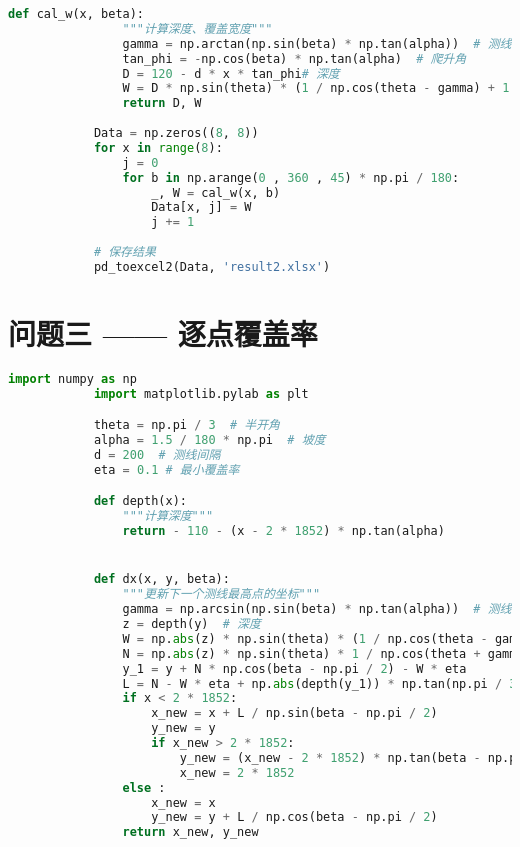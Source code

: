 \documentclass[withoutpreface,bwprint]{cumcmthesis} %
\begin{document}
\begin{appendices}
\begin{lstlisting}[language=python]
            def cal_w(x, beta):
                """计算深度、覆盖宽度"""
                gamma = np.arctan(np.sin(beta) * np.tan(alpha))  # 测线斜波交线和投影夹角
                tan_phi = -np.cos(beta) * np.tan(alpha)  # 爬升角
                D = 120 - d * x * tan_phi# 深度 
                W = D * np.sin(theta) * (1 / np.cos(theta - gamma) + 1 / np.cos(theta + gamma)) * np.cos(gamma) # 覆盖宽度
                return D, W
            
            Data = np.zeros((8, 8))
            for x in range(8):
                j = 0
                for b in np.arange(0 , 360 , 45) * np.pi / 180:
                    _, W = cal_w(x, b)
                    Data[x, j] = W
                    j += 1
            
            # 保存结果
            pd_toexcel2(Data, 'result2.xlsx')
            \end{lstlisting}

            \section{问题三 —— 逐点覆盖率}
            \begin{lstlisting}[language=python]
            import numpy as np
            import matplotlib.pylab as plt

            theta = np.pi / 3  # 半开角
            alpha = 1.5 / 180 * np.pi  # 坡度
            d = 200  # 测线间隔
            eta = 0.1 # 最小覆盖率

            def depth(x):
                """计算深度"""
                return - 110 - (x - 2 * 1852) * np.tan(alpha)


            def dx(x, y, beta):
                """更新下一个测线最高点的坐标"""
                gamma = np.arcsin(np.sin(beta) * np.tan(alpha))  # 测线斜波交线和投影夹角
                z = depth(y)  # 深度
                W = np.abs(z) * np.sin(theta) * (1 / np.cos(theta - gamma) + 1 / np.cos(theta + gamma)) * np.cos(gamma) # 覆盖宽度
                N = np.abs(z) * np.sin(theta) * 1 / np.cos(theta + gamma) * np.cos(gamma) # 平分线一侧覆盖宽度
                y_1 = y + N * np.cos(beta - np.pi / 2) - W * eta
                L = N - W * eta + np.abs(depth(y_1)) * np.tan(np.pi / 3)
                if x < 2 * 1852:
                    x_new = x + L / np.sin(beta - np.pi / 2) 
                    y_new = y
                    if x_new > 2 * 1852:
                        y_new = (x_new - 2 * 1852) * np.tan(beta - np.pi / 2)
                        x_new = 2 * 1852
                else :
                    x_new = x
                    y_new = y + L / np.cos(beta - np.pi / 2)
                return x_new, y_new



\end{lstlisting}
\end{appendices}
\end{document}
